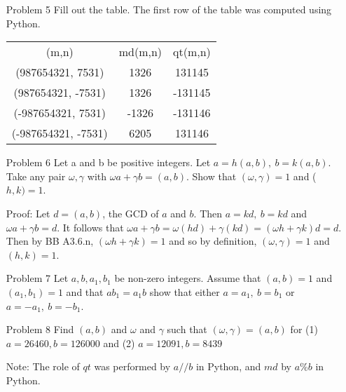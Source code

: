 \documentclass[letterpaper]{article}
\begin{document}
\begin{itemize}
    \item[Problem 5] Fill out the table. The first row of the table was computed using Python.
          \begin{center}
              \begin{tabular}{ c c c }
                  (m,n)               & md(m,n) & qt(m,n) \\
                  (987654321, 7531)   & 1326    & 131145  \\
                  (987654321, -7531)  & 1326    & -131145 \\
                  (-987654321, 7531)  & -1326   & -131146 \\
                  (-987654321, -7531) & 6205    & 131146
              \end{tabular}
          \end{center}

    \item[Problem 6]Let a and b be positive integers. Let \(a = h(a, b),\ b = k(a, b)\). Take any pair \(\omega, \gamma\) with \(\omega a + \gamma b = (a, b)\). Show that \((\omega, \gamma) = 1\)  and (\(h, k) = 1\).

          Proof: Let \(d = (a, b)\), the GCD of \(a\) and \(b\). Then \(a = kd,\ b = kd\) and \(\omega a + \gamma b = d\). It follows that \(\omega a + \gamma b = \omega(hd) + \gamma(kd) = (\omega h + \gamma k)d = d\).
          Then by BB A3.6.n, \((\omega h + \gamma k) = 1\) and so by definition, \((\omega, \gamma) = 1\) and \((h, k) = 1\).
    \item[Problem 7] Let \(a, b, a_1, b_1\) be non-zero integers. Assume that \((a, b) = 1\) and \((a_1, b_1) = 1\) and that \(ab_1 = a_1b\) show that either \(a = a_1,\ b = b_1\) or \(a = -a_1,\ b = -b_1\).


    \item[Problem 8] Find \((a, b)\) and \(\omega\) and \(\gamma\) such that \((\omega, \gamma) = (a,b)\) for (1) \(a = 26460, b = 126000\) and (2) \(a = 12091, b = 8439\)

          Note: The role of \(qt\) was performed by \(a // b\) in Python, and \(md\) by \(a \% b\) in Python.


\end{itemize}
\end{document}
